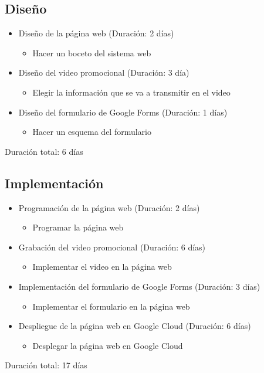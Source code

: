 \documentclass{report}
\begin{document}
            \subsection{Diseño}
                \begin{itemize}
                    \item Diseño de la página web (Duración: 2 días)
                    \begin{itemize}
                        \item Hacer un boceto del sistema web
                    \end{itemize}
                    \item Diseño del video promocional (Duración: 3 día)
                    \begin{itemize}
                        \item Elegir la información que se va a transmitir en el video
                    \end{itemize}
                    \item Diseño del formulario de Google Forms (Duración: 1 días)
                    \begin{itemize}
                        \item Hacer un esquema del formulario
                    \end{itemize}
                \end{itemize}
                Duración total: 6 días
            \subsection{Implementación}
                \begin{itemize}
                    \item Programación de la página web (Duración: 2 días)
                    \begin{itemize}
                        \item Programar la página web
                    \end{itemize}
                    \item Grabación del video promocional (Duración: 6 días)
                    \begin{itemize}
                        \item Implementar el video en la página web
                    \end{itemize}
                    \item Implementación del formulario de Google Forms (Duración: 3 días)
                    \begin{itemize}
                        \item Implementar el formulario en la página web
                    \end{itemize}
                    \item Despliegue de la página web en Google Cloud (Duración: 6 días)
                    \begin{itemize}
                        \item Desplegar la página web en Google Cloud
                    \end{itemize}
                \end{itemize}
                Duración total: 17 días
\end{document}
